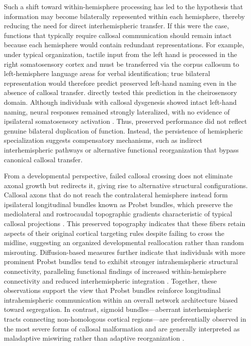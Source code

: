 \documentclass{article}
\begin{document}
Such a shift toward within-hemisphere processing has led to the hypothesis that information may become bilaterally represented within each hemisphere, thereby reducing the need for direct interhemispheric transfer. If this were the case, functions that typically require callosal communication should remain intact because each hemisphere would contain redundant representations. For example, under typical organization, tactile input from the left hand is processed in the right somatosensory cortex and must be transferred via the corpus callosum to left-hemisphere language areas for verbal identification; true bilateral representation would therefore predict preserved left-hand naming even in the absence of callosal transfer. \citep{Monteiro2019} directly tested this prediction in the cheirosensory domain. Although individuals with callosal dysgenesis showed intact left-hand naming, neural responses remained strongly lateralized, with no evidence of ipsilateral somatosensory activation \citep{Monteiro2019}. Thus, preserved performance did not reflect genuine bilateral duplication of function. Instead, the persistence of hemispheric specialization suggests compensatory mechanisms, such as indirect interhemispheric pathways or alternative functional reorganization that bypass canonical callosal transfer.

From a developmental perspective, failed callosal crossing does not eliminate axonal growth but redirects it, giving rise to alternative structural configurations. Callosal axons that do not reach the contralateral hemisphere instead form ipsilateral longitudinal bundles known as Probst bundles, which preserve the mediolateral and rostrocaudal topographic gradients characteristic of typical callosal projections \citep{Tovarmoll2007,Wahl2009}. This preserved topography indicates that these fibers retain aspects of their original cortical targeting rules despite failing to cross the midline, suggesting an organized developmental reallocation rather than random misrouting. Diffusion-based measures further indicate that individuals with more prominent Probst bundles tend to exhibit stronger intrahemispheric structural connectivity, paralleling functional findings of increased within-hemisphere connectivity and reduced interhemispheric integration \citep{Paul2012,Yuan2020,Shi2021}. Together, these observations support the view that Probst bundles reinforce longitudinal intrahemispheric communication within an overall network architecture biased toward segregation. In contrast, sigmoid bundles—aberrant interhemispheric tracts connecting non-homologous cortical regions—are preferentially observed in the most severe forms of callosal malformation and are generally interpreted as maladaptive miswiring rather than adaptive reorganization \citep{Owen2013}.
\end{document}
